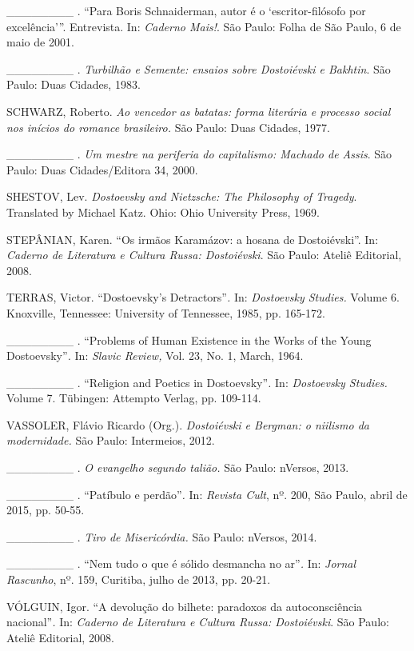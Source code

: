 \_\_\_\_\_\_\_\_ . ``Para Boris Schnaiderman, autor é o
`escritor-filósofo por excelência'''. Entrevista. In: \emph{Caderno
Mais!}. São Paulo: Folha de São Paulo, 6 de maio de 2001.

\_\_\_\_\_\_\_\_ . \emph{Turbilhão e Semente: ensaios sobre Dostoiévski
e Bakhtin}. São Paulo: Duas Cidades, 1983.

SCHWARZ, Roberto. \emph{Ao vencedor as batatas: forma literária e
processo social nos inícios do romance brasileiro.} São Paulo: Duas
Cidades, 1977.

\_\_\_\_\_\_\_\_ . \emph{Um mestre na periferia do capitalismo: Machado
de Assis}. São Paulo: Duas Cidades/Editora 34, 2000.

SHESTOV, Lev. \emph{Dostoevsky and Nietzsche: The Philosophy of
Tragedy}. Translated by Michael Katz. Ohio: Ohio University Press, 1969.

STEPÂNIAN, Karen. ``Os irmãos Karamázov: a hosana de Dostoiévski''. In:
\emph{Caderno de Literatura e Cultura Russa: Dostoiévski}. São Paulo:
Ateliê Editorial, 2008.

TERRAS, Victor. ``Dostoevsky's Detractors''\emph{.} In: \emph{Dostoevsky
Studies.} Volume 6. Knoxville, Tennessee: University of Tennessee, 1985,
pp. 165-172.

\_\_\_\_\_\_\_\_ . ``Problems of Human Existence in the Works of the
Young Dostoevsky''\emph{.} In: \emph{Slavic Review,} Vol. 23, No. 1,
March, 1964.

\_\_\_\_\_\_\_\_ . ``Religion and Poetics in Dostoevsky''\emph{.} In:
\emph{Dostoevsky Studies.} Volume 7. Tübingen: Attempto Verlag, pp.
109-114.

VASSOLER, Flávio Ricardo (Org.). \emph{Dostoiévski e Bergman: o niilismo
da modernidade.} São Paulo: Intermeios, 2012.

\_\_\_\_\_\_\_\_ . \emph{O evangelho segundo talião.} São Paulo:
nVersos, 2013.

\_\_\_\_\_\_\_\_ . ``Patíbulo e perdão''\emph{.} In: \emph{Revista
Cult}, nº. 200, São Paulo, abril de 2015, pp. 50-55.

\_\_\_\_\_\_\_\_ . \emph{Tiro de Misericórdia.} São Paulo: nVersos,
2014.

\_\_\_\_\_\_\_\_ . ``Nem tudo o que é sólido desmancha no ar''\emph{.}
In: \emph{Jornal Rascunho}, nº. 159, Curitiba, julho de 2013, pp. 20-21.

VÓLGUIN, Igor. ``A devolução do bilhete: paradoxos da autoconsciência
nacional''\emph{.} In: \emph{Caderno de Literatura e Cultura Russa:
Dostoiévski}. São Paulo: Ateliê Editorial, 2008.

